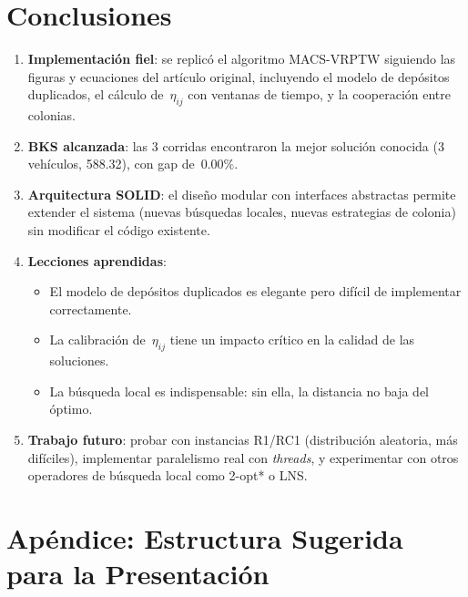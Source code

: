 \documentclass[12pt, letterpaper]{article}
\begin{document}
\newpage
\section{Conclusiones}
\label{sec:conclusiones}

\begin{enumerate}[leftmargin=2cm]
  \item \textbf{Implementación fiel}: se replicó el algoritmo MACS-VRPTW siguiendo las figuras y ecuaciones del artículo original, incluyendo el modelo de depósitos duplicados, el cálculo de~$\eta_{ij}$ con ventanas de tiempo, y la cooperación entre colonias.

  \item \textbf{BKS alcanzada}: las 3 corridas encontraron la mejor solución conocida (3 vehículos, 588.32), con gap de~$0.00\%$.

  \item \textbf{Arquitectura SOLID}: el diseño modular con interfaces abstractas permite extender el sistema (nuevas búsquedas locales, nuevas estrategias de colonia) sin modificar el código existente.

  \item \textbf{Lecciones aprendidas}:
  \begin{itemize}
    \item El modelo de depósitos duplicados es elegante pero difícil de implementar correctamente.
    \item La calibración de~$\eta_{ij}$ tiene un impacto crítico en la calidad de las soluciones.
    \item La búsqueda local es indispensable: sin ella, la distancia no baja del óptimo.
  \end{itemize}

  \item \textbf{Trabajo futuro}: probar con instancias R1/RC1 (distribución aleatoria, más difíciles), implementar paralelismo real con \textit{threads}, y experimentar con otros operadores de búsqueda local como 2-opt* o LNS.
\end{enumerate}

\newpage
\section*{Apéndice: Estructura Sugerida para la Presentación}
\end{document}
